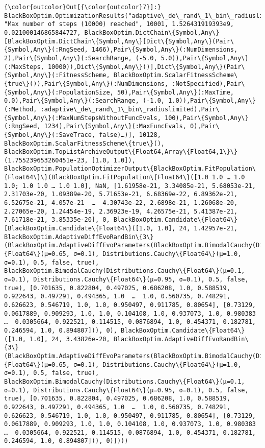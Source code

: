 \documentclass[11pt]{article}
\begin{document}
            \begin{Verbatim}[commandchars=\\\{\}]
{\color{outcolor}Out[{\color{outcolor}7}]:} BlackBoxOptim.OptimizationResults("adaptive\_de\_rand\_1\_bin\_radiuslimited", "Max number of steps (10000) reached", 10001, 1.526431919393e9, 0.021000146865844727, BlackBoxOptim.DictChain\{Symbol,Any\}[BlackBoxOptim.DictChain\{Symbol,Any\}[Dict\{Symbol,Any\}(Pair\{Symbol,Any\}(:RngSeed, 1466),Pair\{Symbol,Any\}(:NumDimensions, 2),Pair\{Symbol,Any\}(:SearchRange, (-5.0, 5.0)),Pair\{Symbol,Any\}(:MaxSteps, 10000)),Dict\{Symbol,Any\}()],Dict\{Symbol,Any\}(Pair\{Symbol,Any\}(:FitnessScheme, BlackBoxOptim.ScalarFitnessScheme\{true\}()),Pair\{Symbol,Any\}(:NumDimensions, :NotSpecified),Pair\{Symbol,Any\}(:PopulationSize, 50),Pair\{Symbol,Any\}(:MaxTime, 0.0),Pair\{Symbol,Any\}(:SearchRange, (-1.0, 1.0)),Pair\{Symbol,Any\}(:Method, :adaptive\_de\_rand\_1\_bin\_radiuslimited),Pair\{Symbol,Any\}(:MaxNumStepsWithoutFuncEvals, 100),Pair\{Symbol,Any\}(:RngSeed, 1234),Pair\{Symbol,Any\}(:MaxFuncEvals, 0),Pair\{Symbol,Any\}(:SaveTrace, false)…)], 10128, BlackBoxOptim.ScalarFitnessScheme\{true\}(), BlackBoxOptim.TopListArchiveOutput\{Float64,Array\{Float64,1\}\}(1.755239653260451e-23, [1.0, 1.0]), BlackBoxOptim.PopulationOptimizerOutput\{BlackBoxOptim.FitPopulation\{Float64\}\}(BlackBoxOptim.FitPopulation\{Float64\}([1.0 1.0 … 1.0 1.0; 1.0 1.0 … 1.0 1.0], NaN, [1.61958e-21, 3.34085e-21, 5.68053e-21, 2.31703e-20, 1.09389e-20, 5.71653e-21, 6.68369e-22, 6.89362e-21, 6.52675e-21, 4.057e-21  …  4.30743e-22, 2.6898e-21, 1.26068e-20, 2.27065e-20, 1.24454e-19, 2.36923e-19, 4.26575e-21, 5.41387e-21, 7.61718e-21, 3.85335e-20], 0, BlackBoxOptim.Candidate\{Float64\}[BlackBoxOptim.Candidate\{Float64\}([1.0, 1.0], 24, 1.42957e-21, BlackBoxOptim.AdaptiveDiffEvoRandBin\{3\}(BlackBoxOptim.AdaptiveDiffEvoParameters(BlackBoxOptim.BimodalCauchy(Distributions.Cauchy\{Float64\}(μ=0.65, σ=0.1), Distributions.Cauchy\{Float64\}(μ=1.0, σ=0.1), 0.5, false, true), BlackBoxOptim.BimodalCauchy(Distributions.Cauchy\{Float64\}(μ=0.1, σ=0.1), Distributions.Cauchy\{Float64\}(μ=0.95, σ=0.1), 0.5, false, true), [0.701635, 0.822804, 0.497025, 0.686208, 1.0, 0.588519, 0.922643, 0.497291, 0.494365, 1.0  …  1.0, 0.560735, 0.748291, 0.626623, 0.546719, 1.0, 1.0, 0.950497, 0.911785, 0.80654], [0.73129, 0.0617889, 0.909293, 1.0, 1.0, 0.104108, 1.0, 0.937073, 1.0, 0.980383  …  0.0305664, 0.922521, 0.114515, 0.0876894, 1.0, 0.454371, 0.182781, 0.246594, 1.0, 0.894807])), 0), BlackBoxOptim.Candidate\{Float64\}([1.0, 1.0], 24, 3.43826e-20, BlackBoxOptim.AdaptiveDiffEvoRandBin\{3\}(BlackBoxOptim.AdaptiveDiffEvoParameters(BlackBoxOptim.BimodalCauchy(Distributions.Cauchy\{Float64\}(μ=0.65, σ=0.1), Distributions.Cauchy\{Float64\}(μ=1.0, σ=0.1), 0.5, false, true), BlackBoxOptim.BimodalCauchy(Distributions.Cauchy\{Float64\}(μ=0.1, σ=0.1), Distributions.Cauchy\{Float64\}(μ=0.95, σ=0.1), 0.5, false, true), [0.701635, 0.822804, 0.497025, 0.686208, 1.0, 0.588519, 0.922643, 0.497291, 0.494365, 1.0  …  1.0, 0.560735, 0.748291, 0.626623, 0.546719, 1.0, 1.0, 0.950497, 0.911785, 0.80654], [0.73129, 0.0617889, 0.909293, 1.0, 1.0, 0.104108, 1.0, 0.937073, 1.0, 0.980383  …  0.0305664, 0.922521, 0.114515, 0.0876894, 1.0, 0.454371, 0.182781, 0.246594, 1.0, 0.894807])), 0)])))

\end{Verbatim}
\end{document}
